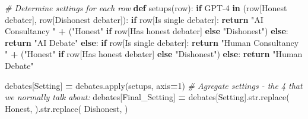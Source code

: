 \documentclass[
]{article}
\newenvironment{Shaded}{\begin{snugshade}}{\end{snugshade}}
\newcommand{\BuiltInTok}[1]{#1}
\newcommand{\CommentTok}[1]{\textcolor[rgb]{0.56,0.35,0.01}{\textit{#1}}}
\newcommand{\ControlFlowTok}[1]{\textcolor[rgb]{0.13,0.29,0.53}{\textbf{#1}}}
\newcommand{\DecValTok}[1]{\textcolor[rgb]{0.00,0.00,0.81}{#1}}
\newcommand{\KeywordTok}[1]{\textcolor[rgb]{0.13,0.29,0.53}{\textbf{#1}}}
\newcommand{\NormalTok}[1]{#1}
\newcommand{\OperatorTok}[1]{\textcolor[rgb]{0.81,0.36,0.00}{\textbf{#1}}}
\newcommand{\StringTok}[1]{\textcolor[rgb]{0.31,0.60,0.02}{#1}}
\begin{document}
\begin{Shaded}
\begin{Highlighting}[]


\CommentTok{\# Determine settings for each row}
\KeywordTok{def}\NormalTok{ setups(row):}
    \ControlFlowTok{if} \StringTok{\textquotesingle{}GPT{-}4\textquotesingle{}} \KeywordTok{in}\NormalTok{ (row[}\StringTok{\textquotesingle{}Honest debater\textquotesingle{}}\NormalTok{], row[}\StringTok{\textquotesingle{}Dishonest debater\textquotesingle{}}\NormalTok{]):}
        \ControlFlowTok{if}\NormalTok{ row[}\StringTok{\textquotesingle{}Is single debater\textquotesingle{}}\NormalTok{]:}
            \ControlFlowTok{return} \StringTok{"AI Consultancy "} \OperatorTok{+}\NormalTok{ (}\StringTok{"Honest"} \ControlFlowTok{if}\NormalTok{ row[}\StringTok{\textquotesingle{}Has honest debater\textquotesingle{}}\NormalTok{] }\ControlFlowTok{else} \StringTok{"Dishonest"}\NormalTok{)}
        \ControlFlowTok{else}\NormalTok{:}
            \ControlFlowTok{return} \StringTok{"AI Debate"}
    \ControlFlowTok{else}\NormalTok{:}
        \ControlFlowTok{if}\NormalTok{ row[}\StringTok{\textquotesingle{}Is single debater\textquotesingle{}}\NormalTok{]:}
            \ControlFlowTok{return} \StringTok{"Human Consultancy "} \OperatorTok{+}\NormalTok{ (}\StringTok{"Honest"} \ControlFlowTok{if}\NormalTok{ row[}\StringTok{\textquotesingle{}Has honest debater\textquotesingle{}}\NormalTok{] }\ControlFlowTok{else} \StringTok{"Dishonest"}\NormalTok{)}
        \ControlFlowTok{else}\NormalTok{:}
            \ControlFlowTok{return} \StringTok{"Human Debate"}

\NormalTok{debates[}\StringTok{\textquotesingle{}Setting\textquotesingle{}}\NormalTok{] }\OperatorTok{=}\NormalTok{ debates.}\BuiltInTok{apply}\NormalTok{(setups, axis}\OperatorTok{=}\DecValTok{1}\NormalTok{)}
\CommentTok{\# Agregate settings {-} the 4 that we normally talk about:}
\NormalTok{debates[}\StringTok{\textquotesingle{}Final\_Setting\textquotesingle{}}\NormalTok{] }\OperatorTok{=}\NormalTok{ debates[}\StringTok{\textquotesingle{}Setting\textquotesingle{}}\NormalTok{].}\BuiltInTok{str}\NormalTok{.replace(}\StringTok{\textquotesingle{} Honest\textquotesingle{}}\NormalTok{, }\StringTok{\textquotesingle{}\textquotesingle{}}\NormalTok{).}\BuiltInTok{str}\NormalTok{.replace(}\StringTok{\textquotesingle{} Dishonest\textquotesingle{}}\NormalTok{, }\StringTok{\textquotesingle{}\textquotesingle{}}\NormalTok{)}
\end{Highlighting}
\end{Shaded}
\end{document}
